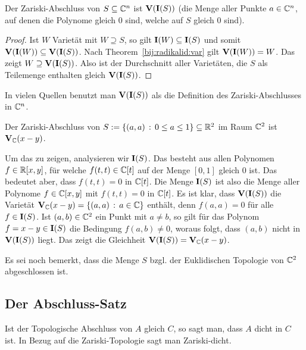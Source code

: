 \documentclass[11pt]{article}
\numberwithin{equation}{section}
\begin{document}
\begin{theorem} \label{darstell:zar:abschl}
	Der Zariski-Abschluss von 
 $S \subseteq \mathbb{C}^n$ ist $\mathbf{V}(\mathbf{I}(S))$ (die Menge aller Punkte $a \in \mathbb{C}^n$, auf denen die Polynome gleich $0$ sind, welche auf $S$ gleich $0$ sind). 
\end{theorem} 
\begin{proof} 
		Ist $W$ Varietät mit $W \supseteq S$, so gilt $\mathbf{I}(W) \subseteq \mathbf{I}(S)$ und somit $\mathbf{V}(\mathbf{I}(W)) \subseteq \mathbf{V}(\mathbf{I}(S))$.  Nach Theorem~\ref{bij:radikalid:var}  gilt  $\mathbf{V}(\mathbf{I}(W)) = W$. Das zeigt $W \supseteq \mathbf{V}(\mathbf{I}(S))$. Also ist der Durchschnitt aller Varietäten, die $S$ als Teilemenge enthalten gleich $\mathbf{V}(\mathbf{I}(S))$. 
\end{proof} 

\begin{remark}
	In vielen Quellen benutzt man $\mathbf{V}(\mathbf{I}(S))$ als die Definition des Zariski-Abschlusses in $\mathbb{C}^n$. 
\end{remark}

\begin{beispiel} 
	Der Zariski-Abschluss von $S:=\left\{  (a,a)  \,:\, 0 \le a \le 1 \right\} \subseteq \mathbb{R}^2$ im Raum $\mathbb{C}^2$ ist $\mathbf{V}_{\mathbb{C}}(x-y)$. 
	
	Um das zu zeigen, analysieren wir $\mathbf{I}(S)$. Das besteht aus allen Polynomen $f \in \mathbb{R}[x,y]$, für welche $f(t,t) \in \mathbb{C}[t]$ auf der Menge $[0,1]$ gleich $0$ ist. Das bedeutet aber, dass $f(t,t) = 0$ in $\mathbb{C}[t]$.  Die Menge $\mathbf{I}(S)$ ist also die Menge aller Polynome $f \in \mathbb{C}[x,y]$ mit $f(t,t) =0$ in $\mathbb{C}[t]$. Es ist klar, dass $\mathbf{V}(\mathbf{I}(S))$ die Varietät $\mathbf{V}_{\mathbb{C}}(x-y) = \left\{ (a,a) \,:\, a \in \mathbb{C} \right\}$ enthält, denn $f(a,a) = 0$ für alle $f \in \mathbf{I}(S)$. Ist $(a,b) \in \mathbb{C}^2$ ein Punkt mit $a \ne b$, so gilt für das Polynom $f = x-y \in \mathbf{I}(S)$ die Bedingung $f(a,b) \ne 0$, woraus folgt, dass $(a,b)$ nicht in $\mathbf{V}(\mathbf{I}(S))$ liegt. Das zeigt die Gleichheit $\mathbf{V}(\mathbf{I}(S)) = \mathbf{V}_{\mathbb{C}}(x-y)$. 
	
	Es sei noch bemerkt, dass die Menge $S$ bzgl. der Euklidischen Topologie von $\mathbb{C}^2$ abgeschlossen ist. 
\end{beispiel} 

\subsection{Der Abschluss-Satz} 

\begin{definition}
	Ist der Topologische Abschluss von  $A$ gleich $C$, so sagt man, dass $A$ dicht in $C$ ist. In Bezug auf die Zariski-Topologie sagt man Zariski-dicht. 
\end{definition} 
\end{document}
